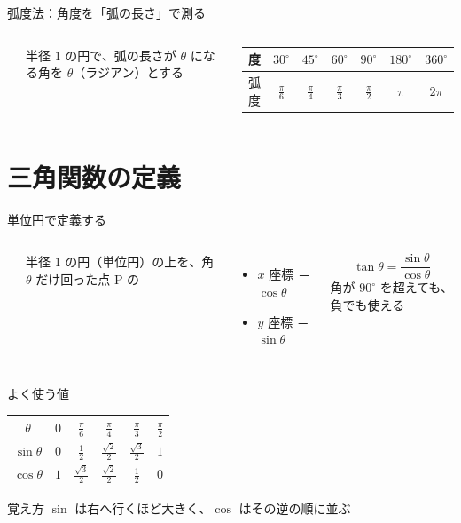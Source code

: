 \documentclass[aspectratio=169]{beamer}
\begin{document}
\begin{frame}{弧度法：角度を「弧の長さ」で測る}
  \begin{columns}[c]
      \begin{center}
        
      \end{center}
      半径 $1$ の円で、弧の長さが $\theta$ になる角を $\theta$（ラジアン）とする
      \medskip
      \begin{center}
        \renewcommand{\arraystretch}{1.3}
        \begin{tabular}{c|cccccc}
          度 & $30^\circ$ & $45^\circ$ & $60^\circ$ & $90^\circ$ & $180^\circ$ & $360^\circ$ \\ \hline
          弧度 & $\frac{\pi}{6}$ & $\frac{\pi}{4}$ & $\frac{\pi}{3}$ & $\frac{\pi}{2}$ & $\pi$ & $2\pi$
        \end{tabular}
      \end{center}
      \medskip
  \end{columns}
\end{frame}

\section{三角関数の定義}

\begin{frame}{単位円で定義する}
  \begin{columns}[c]
      \begin{center}
        
      \end{center}
      半径 $1$ の円（単位円）の上を、角 $\theta$ だけ回った点 P の
      \begin{itemize}
        \item $x$ 座標 ＝ $\cos\theta$
        \item $y$ 座標 ＝ $\sin\theta$
      \end{itemize}
      \[
        \tan\theta = \frac{\sin\theta}{\cos\theta}
      \]
      {\small 角が $90^\circ$ を超えても、負でも使える}
  \end{columns}
\end{frame}

\begin{frame}{よく使う値}
  \begin{center}
    \renewcommand{\arraystretch}{1.6}
    \begin{tabular}{c|ccccc}
      $\theta$ & $0$ & $\frac{\pi}{6}$ & $\frac{\pi}{4}$ & $\frac{\pi}{3}$ & $\frac{\pi}{2}$ \\ \hline
      $\sin\theta$ & $0$ & $\frac{1}{2}$ & $\frac{\sqrt{2}}{2}$ & $\frac{\sqrt{3}}{2}$ & $1$ \\
      $\cos\theta$ & $1$ & $\frac{\sqrt{3}}{2}$ & $\frac{\sqrt{2}}{2}$ & $\frac{1}{2}$ & $0$
    \end{tabular}
  \end{center}
  \medskip
  \begin{block}{覚え方}
    $\sin$ は右へ行くほど大きく、$\cos$ はその逆の順に並ぶ
  \end{block}
\end{frame}
\end{document}

